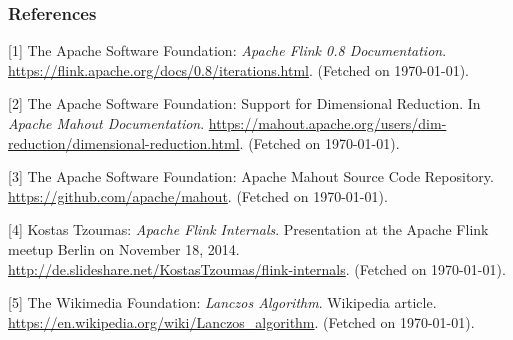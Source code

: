 \subsubsection*{References}


\small{
[1] The Apache Software Foundation: {\it Apache Flink 0.8 Documentation}. 
\url{https://flink.apache.org/docs/0.8/iterations.html}. (Fetched on \today).

[2] The Apache Software Foundation: Support for Dimensional Reduction. In
{\it Apache Mahout Documentation}.
\url{https://mahout.apache.org/users/dim-reduction/dimensional-reduction.html}.
(Fetched on \today).

[3] The Apache Software Foundation: Apache Mahout Source Code Repository.
\url{https://github.com/apache/mahout}. (Fetched on \today).

[4] Kostas Tzoumas: {\it Apache Flink Internals}. Presentation at the Apache
Flink meetup Berlin on November 18, 2014.
\url{http://de.slideshare.net/KostasTzoumas/flink-internals}. (Fetched on
\today).

[5] The Wikimedia Foundation: {\it Lanczos Algorithm}. Wikipedia article.
\url{https://en.wikipedia.org/wiki/Lanczos_algorithm}. (Fetched on \today).
}